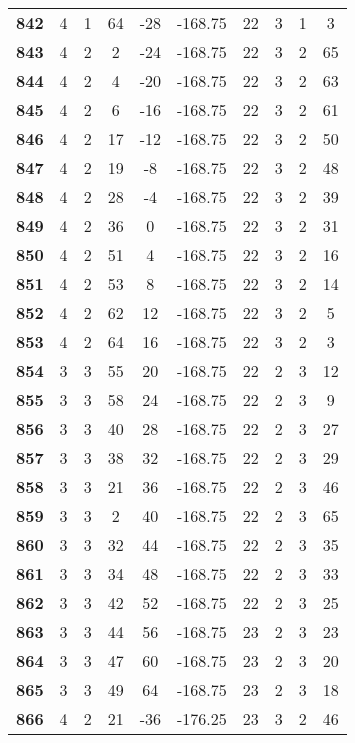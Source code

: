 \documentclass[12pt,letterpaper, onecolumn]{exam}
\begin{document}
\begin{longtable}{cccccccccc}
    \textbf{842} & 4 & 1 & 64 & -28 & -168.75 & 22 & 3 & 1 & 3 \\ 
    \textbf{843} & 4 & 2 & 2 & -24 & -168.75 & 22 & 3 & 2 & 65 \\ 
    \textbf{844} & 4 & 2 & 4 & -20 & -168.75 & 22 & 3 & 2 & 63 \\ 
    \textbf{845} & 4 & 2 & 6 & -16 & -168.75 & 22 & 3 & 2 & 61 \\ 
    \textbf{846} & 4 & 2 & 17 & -12 & -168.75 & 22 & 3 & 2 & 50 \\ 
    \textbf{847} & 4 & 2 & 19 & -8 & -168.75 & 22 & 3 & 2 & 48 \\ 
    \textbf{848} & 4 & 2 & 28 & -4 & -168.75 & 22 & 3 & 2 & 39 \\ 
    \textbf{849} & 4 & 2 & 36 & 0 & -168.75 & 22 & 3 & 2 & 31 \\ 
    \textbf{850} & 4 & 2 & 51 & 4 & -168.75 & 22 & 3 & 2 & 16 \\ 
    \textbf{851} & 4 & 2 & 53 & 8 & -168.75 & 22 & 3 & 2 & 14 \\ 
    \textbf{852} & 4 & 2 & 62 & 12 & -168.75 & 22 & 3 & 2 & 5 \\       \hline
    \textbf{853} & 4 & 2 & 64 & 16 & -168.75 & 22 & 3 & 2 & 3 \\ 
    \textbf{854} & 3 & 3 & 55 & 20 & -168.75 & 22 & 2 & 3 & 12 \\ 
    \textbf{855} & 3 & 3 & 58 & 24 & -168.75 & 22 & 2 & 3 & 9 \\ 
    \textbf{856} & 3 & 3 & 40 & 28 & -168.75 & 22 & 2 & 3 & 27 \\ 
    \textbf{857} & 3 & 3 & 38 & 32 & -168.75 & 22 & 2 & 3 & 29 \\ 
    \textbf{858} & 3 & 3 & 21 & 36 & -168.75 & 22 & 2 & 3 & 46 \\ 
    \textbf{859} & 3 & 3 & 2 & 40 & -168.75 & 22 & 2 & 3 & 65 \\ 
    \textbf{860} & 3 & 3 & 32 & 44 & -168.75 & 22 & 2 & 3 & 35 \\ 
    \textbf{861} & 3 & 3 & 34 & 48 & -168.75 & 22 & 2 & 3 & 33 \\ 
    \textbf{862} & 3 & 3 & 42 & 52 & -168.75 & 22 & 2 & 3 & 25 \\ 
    \textbf{863} & 3 & 3 & 44 & 56 & -168.75 & 23 & 2 & 3 & 23 \\ 
    \textbf{864} & 3 & 3 & 47 & 60 & -168.75 & 23 & 2 & 3 & 20 \\ 
    \textbf{865} & 3 & 3 & 49 & 64 & -168.75 & 23 & 2 & 3 & 18 \\ 
    \textbf{866} & 4 & 2 & 21 & -36 & -176.25 & 23 & 3 & 2 & 46 \\ 

\end{longtable}
\end{document}
